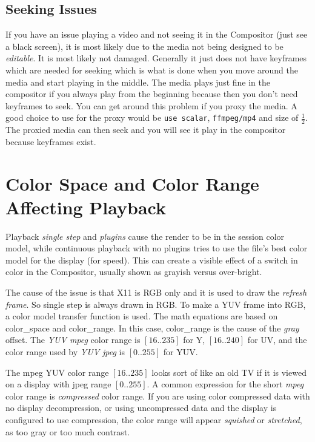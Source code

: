 \subsection{Seeking Issues}%
\label{sub:seeking_issue}

If you have an issue playing a video and not seeing it in the Compositor (just see a black screen), it is most likely due to the media not being designed to be \textit{editable}.  It is most likely not damaged.  Generally it just does not have keyframes which are needed for seeking which is what is done when you move around the media and start playing in the middle.  The media plays just fine in the compositor if you always play from the beginning because then you don’t need keyframes to seek.  You can get around this problem if you proxy the media.  A good choice to use for the proxy would be \texttt{use scalar}, \texttt{ffmpeg/mp4} and size of $\frac{1}{2}$.  The proxied media can then seek and you will see it play in the compositor because keyframes exist.

\section{Color Space and Color Range Affecting Playback}%
\label{sec:color_space_range_playback}

Playback \textit{single step} and \textit{plugins} cause the render to be in the session color model, while continuous playback with no plugins tries to use the file’s best color model for the display (for speed).
This can create a visible effect of a switch in color in the Compositor, usually shown as grayish versus over-bright.

The cause of the issue is that X11 is RGB only and it is used to draw the \textit{refresh frame}.  So single step is always drawn in RGB.  To make a YUV frame into RGB, a color model transfer function is used.  The math equations are based on color\_space and color\_range.  In this case, color\_range is the cause of the \textit{gray} offset.  The \textit{YUV mpeg} color range is $[16..235]$ for Y, $[16..240]$ for UV, and the color range used by \textit{YUV jpeg} is $[0..255]$ for YUV.

The mpeg YUV color range $[16..235]$ looks sort of like an old TV if it is viewed on a display with jpeg range $[0..255]$.  A common expression for the short \textit{mpeg} color range is \textit{compressed} color range.  If you are using color compressed data with no display decompression, or using uncompressed data and the display is configured to use compression, the color range will appear \textit{squished} or \textit{stretched}, as too gray or too much contrast.

